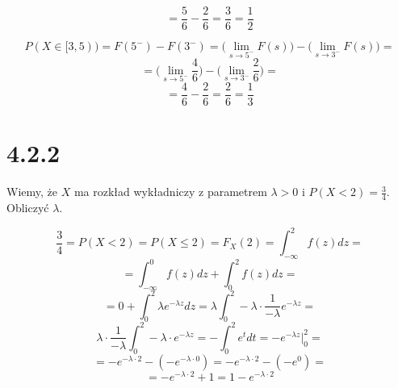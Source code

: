 \documentclass{article}
\begin{document}
\begin{equation*}
    = \frac{5}{6} - \frac{2}{6} = \frac{3}{6} = \frac{1}{2}
\end{equation*}

\begin{equation*}
    P(X \in [3, 5)) = F(5^{-}) - F(3^{-}) = \Big(\lim_{s \to 5^{-}} F(s)\Big) - \Big(\lim_{s \to 3^{-}} F(s)\Big) =
\end{equation*}
\begin{equation*}
    = \Big(\lim_{s \to 5^{-}} \frac{4}{6}\Big) - \Big(\lim_{s \to 3^{-}} \frac{2}{6}\Big) = 
\end{equation*}
\begin{equation*}
    = \frac{4}{6} - \frac{2}{6} = \frac{2}{6} = \frac{1}{3}
\end{equation*}

\section*{4.2.2}

\begin{center}
    Wiemy, że \(X\) ma rozkład wykładniczy z parametrem \(\lambda > 0\) i \(P(X < 2) = \frac{3}{4}\).
    Obliczyć \(\lambda\).
\end{center}

\begin{equation*}
    \frac{3}{4} = P(X < 2) = P(X \leq 2) = F_{X}(2) = \int_{- \infty}^{2} f(z) dz = 
\end{equation*}
\begin{equation*}
    = \int_{- \infty}^{0} f(z)dz + \int_{0}^{2} f(z)dz =
\end{equation*}
\begin{equation*}
    = 0 + \int_{0}^{2} \lambda e^{- \lambda z} dz = \lambda \int_{0}^{2} - \lambda \cdot \frac{1}{- \lambda} e^{- \lambda z} =
\end{equation*}
\begin{equation*}
    \lambda \cdot \frac{1}{- \lambda}  \int_{0}^{2} - \lambda \cdot e^{- \lambda z} = - \int_{0}^{2}  e^{t} dt = -e^{- \lambda z} \biggr\rvert_{0}^{2} =
\end{equation*}
\begin{equation*}
    = -e^{- \lambda \cdot 2} - (-e^{- \lambda \cdot 0}) = -e^{- \lambda \cdot 2} - (-e^{0}) = 
\end{equation*}
\begin{equation*}
    = -e^{- \lambda \cdot 2} + 1 = 1 - e^{- \lambda \cdot 2}
\end{equation*}
\end{document}
